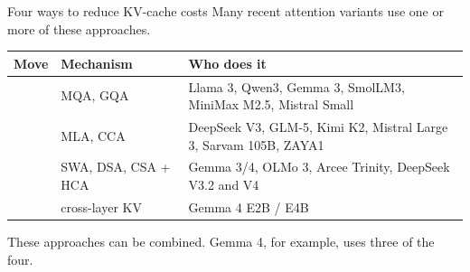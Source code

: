\documentclass[aspectratio=169,10pt]{beamer}
\begin{document}
\begin{frame}[shrink=20]{Four ways to reduce KV-cache costs}
  Many recent attention variants use one or more of these approaches.
  \vspace{0.6em}
  \centering
  \begin{tabular}{@{}L{2.7cm} L{3.4cm} L{5.6cm}@{}}
    \toprule
    \textbf{Move} & \textbf{Mechanism} & \textbf{Who does it}\\
    \midrule
     & MQA, GQA & Llama 3, Qwen3, Gemma 3, SmolLM3, MiniMax M2.5,
      Mistral Small\\[0.3em]
     & MLA, CCA & DeepSeek V3, GLM-5, Kimi K2,
      Mistral Large 3, Sarvam 105B, ZAYA1\\[0.3em]
     & SWA, DSA, CSA + HCA & Gemma 3/4, OLMo 3,
      Arcee Trinity, DeepSeek V3.2 and V4\\[0.3em]
     & cross-layer KV & Gemma 4 E2B / E4B\\
    \bottomrule
  \end{tabular}

  \vspace{0.8em}
  \raggedright
  These approaches can be combined. Gemma 4, for example, uses three of the
  four.
\end{frame}
\end{document}
